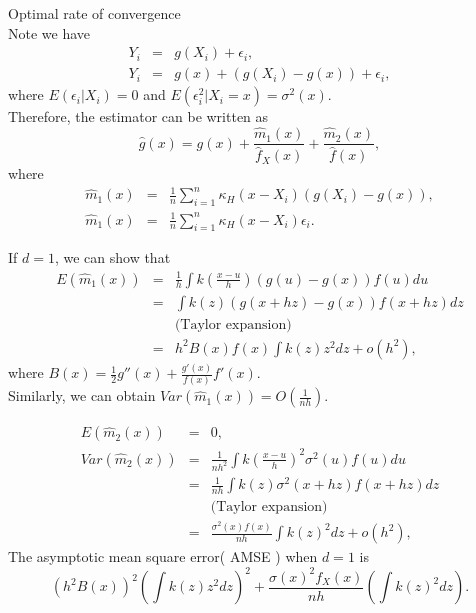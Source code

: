 \documentclass[a4paper,11pt]{article}
\begin{document}
Optimal rate of convergence\\
Note we have
\begin{eqnarray*}
Y_i &=& g(X_i) + \epsilon_i, \\
Y_i &=& g(x) + (g(X_i) - g(x)) + \epsilon_i,
\end{eqnarray*}
where $E(\epsilon_i | X_i) = 0$ and $E(\epsilon^2_i | X_i = x) = \sigma^2(x)$. \\
Therefore, the estimator can be written as
\begin{equation*}
\hat{g}(x) = g(x) + \frac{\hat{m}_{1}(x)}{\hat{f}_{X}(x)} + \frac{\hat{m}_{2}(x)}{\hat{f}(x)},
\end{equation*}
where
\begin{eqnarray*}
\hat{m}_{1}(x) &=&  \frac{1}{n} \sum_{i = 1}^{n} \kappa_{H}(x - X_i)  (g(X_i) - g(x)), \\
\hat{m}_{1}(x) &=&  \frac{1}{n} \sum_{i = 1}^{n} \kappa_{H}(x - X_i)  \epsilon_i.
\end{eqnarray*}


If $d=1$, we can show that
\begin{eqnarray*}
E(\hat{m}_{1}(x)) &=& \frac{1}{h} \int k \left( \frac{x-u}{h} \right) (g(u) - g(x)) f(u) du\\
&=& \int k(z) (g(x+hz) - g(x)) f(x+hz) dz\\
&& \text{(Taylor expansion)} \\ 
&=& h^2 B(x) f(x) \int k(z) z^2 dz + o(h^2),
\end{eqnarray*}
where $B(x) = \frac{1}{2} g''(x) + \frac{g'(x)}{f(x)} f'(x)$.\\
Similarly, we can obtain $Var( \hat{m}_{1}(x)) = O(\frac{1}{nh})$.

\begin{eqnarray*}
E(\hat{m}_{2}(x)) &=& 0, \\
Var(\hat{m}_{2}(x)) &=& \frac{1}{nh^2} \int k \left( \frac{x-u}{h} \right)^2  \sigma^2(u) f(u) du \\
&=& \frac{1}{nh} \int  k(z) \sigma^2(x+hz) f(x+hz) dz \\
&& \text{(Taylor expansion)} \\
&=& \frac{\sigma^2(x)f(x)}{nh}  \int k(z)^2 dz + o(h^2),
\end{eqnarray*}
The asymptotic mean square error( AMSE ) when $d= 1$ is
\begin{equation*}
\left( h^{2} B(x) \right)^{2} \left( \int k(z) z^{2} dz \right)^{2} +  \frac{ \sigma(x)^{2} f_{X}(x)}{nh}  \left( \int k(z)^2 dz \right).
\end{equation*}
\end{document}
